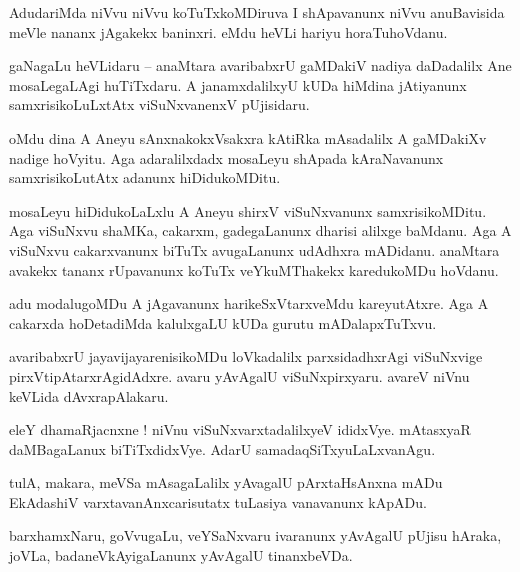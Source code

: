 \documentclass{article}
\begin{document}
\begin{mn}%
AdudariMda niVvu niVvu koTuTxkoMDiruva I shApavanunx niVvu anuBavisida meVle nananx jAgakekx 
baninxri. eMdu heVLi hariyu horaTuhoVdanu.
\end{mn}

\begin{mn}%
gaNagaLu heVLidaru -- anaMtara avaribabxrU gaMDakiV nadiya daDadalilx Ane mosaLegaLAgi huTiTxdaru. 
A janamxdalilxyU kUDa hiMdina jAtiyanunx samxrisikoLuLxtAtx viSuNxvanenxV pUjisidaru.
\end{mn}

\begin{mn}%
oMdu dina A Aneyu sAnxnakokxVsakxra kAtiRka mAsadalilx A gaMDakiXv nadige hoVyitu. Aga 
adaralilxdadx mosaLeyu shApada kAraNavanunx samxrisikoLutAtx adanunx hiDidukoMDitu.
\end{mn}

\begin{mn}%
mosaLeyu hiDidukoLaLxlu A Aneyu shirxV viSuNxvanunx samxrisikoMDitu. Aga viSuNxvu shaMKa, cakarxm, 
gadegaLanunx dharisi alilxge baMdanu. Aga A viSuNxvu cakarxvanunx biTuTx avugaLanunx udAdhxra 
mADidanu. anaMtara avakekx tananx rUpavanunx koTuTx veYkuMThakekx karedukoMDu hoVdanu.
\end{mn}

\begin{mn}%
adu modalugoMDu A jAgavanunx harikeSxVtarxveMdu kareyutAtxre. Aga A cakarxda hoDetadiMda 
kalulxgaLU kUDa gurutu mADalapxTuTxvu.
\end{mn}

\begin{mn}%
avaribabxrU jayavijayarenisikoMDu loVkadalilx parxsidadhxrAgi viSuNxvige pirxVtipAtarxrAgidAdxre. 
avaru yAvAgalU viSuNxpirxyaru. avareV niVnu keVLida dAvxrapAlakaru.
\end{mn}

\begin{mn}%
eleY dhamaRjacnxne ! niVnu viSuNxvarxtadalilxyeV ididxVye. mAtasxyaR daMBagaLanux biTiTxdidxVye. 
AdarU samadaqSiTxyuLaLxvanAgu.
\end{mn}

\begin{mn}%
tulA, makara, meVSa mAsagaLalilx yAvagalU pArxtaHsAnxna mADu EkAdashiV varxtavanAnxcarisutatx 
tuLasiya vanavanunx kApADu.
\end{mn}

\begin{mn}%
barxhamxNaru, goVvugaLu, veYSaNxvaru ivaranunx yAvAgalU pUjisu hAraka, joVLa, badaneVkAyigaLanunx 
yAvAgalU tinanxbeVDa.
\end{mn}
\end{document}
